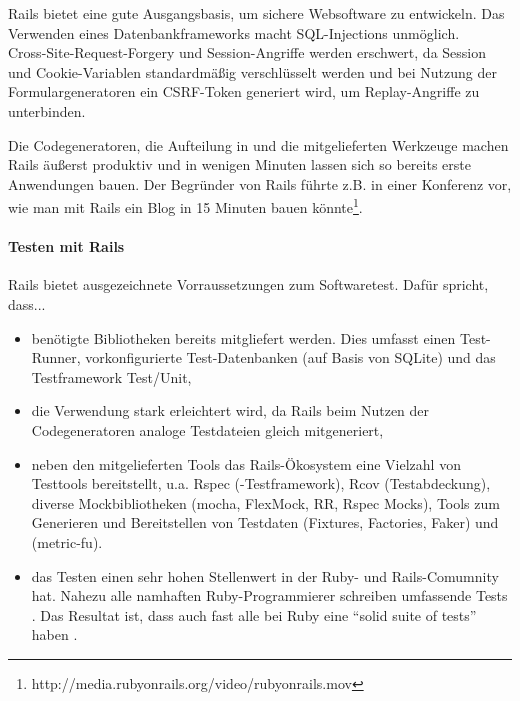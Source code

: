 Rails bietet eine gute Ausgangsbasis, um sichere Websoftware zu entwickeln. Das Verwenden eines Datenbankframeworks macht SQL-Injections unmöglich. \\
Cross-Site-Request-Forgery und Session-Angriffe werden erschwert, da Session und Cookie-Variablen standardmäßig verschlüsselt werden und bei Nutzung der Formulargeneratoren ein CSRF-Token generiert wird, um Replay-Angriffe zu unterbinden.

Die Codegeneratoren, die Aufteilung in  und die mitgelieferten Werkzeuge machen Rails äußerst produktiv und in wenigen Minuten lassen sich so bereits erste Anwendungen bauen. Der Begründer von Rails führte z.B. in einer Konferenz vor, wie man mit Rails ein Blog in 15 Minuten bauen könnte\footnote{http://media.rubyonrails.org/video/rubyonrails.mov}.


\paragraph{Testen mit Rails}
Rails bietet ausgezeichnete Vorraussetzungen zum Softwaretest. Dafür spricht, dass...

\begin{itemize}
  \item benötigte Bibliotheken bereits mitgliefert werden. Dies umfasst einen Test-Runner, vorkonfigurierte Test-Datenbanken (auf Basis von SQLite) und das Testframework Test/Unit,
  \item die Verwendung stark erleichtert wird, da Rails beim Nutzen der Codegeneratoren analoge Testdateien gleich mitgeneriert,
 \item neben den mitgelieferten Tools das Rails-Ökosystem eine Vielzahl von Testtools bereitstellt, u.a. Rspec (-Testframework), Rcov (Testabdeckung), diverse Mockbibliotheken (mocha, FlexMock, RR, Rspec Mocks), Tools zum Generieren und Bereitstellen von Testdaten (Fixtures, Factories, Faker) und  (metric-fu).
 \item das Testen einen sehr hohen Stellenwert in der Ruby- und Rails-Comumnity hat. Nahezu alle namhaften Ruby-Programmierer schreiben umfassende Tests \citep{devries_rails_2008}. Das Resultat ist, dass auch fast alle  bei Ruby eine "`solid suite of tests"' haben \citep{devries_rails_2008}.
\end{itemize}

